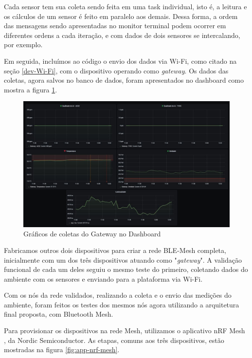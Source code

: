 \documentclass[../monografia.tex]{subfiles}
\begin{document}
Cada sensor tem sua coleta sendo feita em uma task individual, isto é, a leitura e os cálculos de um sensor é feito em paralelo aos demais. Dessa forma, a ordem das mensagens sendo apresentadas no monitor terminal podem ocorrer em diferentes ordens a cada iteração, e com dados de dois sensores se intercalando, por exemplo. \newpage

Em seguida, incluímos ao código o envio dos dados via Wi-Fi, como citado na seção \ref{dev-Wi-Fi}, com o dispositivo operando como \textit{gateway}. Os dados das coletas, agora salvos no banco de dados, foram apresentados no dashboard como mostra a figura \ref{fig:dashboard-graphs}.

\begin{figure}[h]
	\centering
	\includegraphics[width=\textwidth]{dashboard-graphs}
	\caption{Gráficos de coletas do Gateway no Dashboard}
	\label{fig:dashboard-graphs}
\end{figure}

Fabricamos outros dois dispositivos para criar a rede BLE-Mesh completa, inicialmente com um dos três dispositivos atuando como "\textit{gateway}". A validação funcional de cada um deles seguiu o mesmo teste do primeiro, coletando dados do ambiente com os sensores e enviando para a plataforma via Wi-Fi. 

Com os nós da rede validados, realizando a coleta e o envio das medições do ambiente, foram feitos os testes dos mesmos nós agora utilizando a arquitetura final proposta, com Bluetooth Mesh. 

Para provisionar os dispositivos na rede Mesh, utilizamos o aplicativo nRF Mesh \cite{nrf-app}, da Nordic Semiconductor. As etapas, comuns aos três dispositivos, estão mostradas na figura \ref{fig:app-nrf-mesh}.
\end{document}
